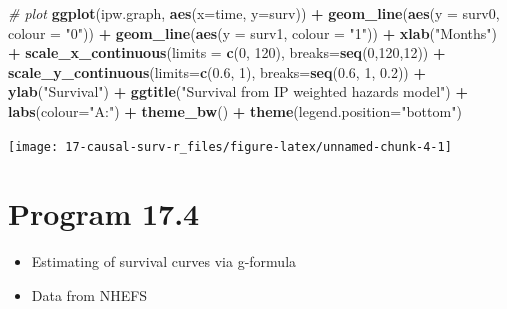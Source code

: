 \documentclass[
  10pt,
]{book}
\newenvironment{Shaded}{\begin{snugshade}}{\end{snugshade}}
\newcommand{\CommentTok}[1]{\textcolor[rgb]{0.56,0.35,0.01}{\textit{#1}}}
\newcommand{\DataTypeTok}[1]{\textcolor[rgb]{0.13,0.29,0.53}{#1}}
\newcommand{\DecValTok}[1]{\textcolor[rgb]{0.00,0.00,0.81}{#1}}
\newcommand{\FloatTok}[1]{\textcolor[rgb]{0.00,0.00,0.81}{#1}}
\newcommand{\KeywordTok}[1]{\textcolor[rgb]{0.13,0.29,0.53}{\textbf{#1}}}
\newcommand{\NormalTok}[1]{#1}
\newcommand{\OperatorTok}[1]{\textcolor[rgb]{0.81,0.36,0.00}{\textbf{#1}}}
\newcommand{\StringTok}[1]{\textcolor[rgb]{0.31,0.60,0.02}{#1}}
\providecommand{\tightlist}{%
  \setlength{\itemsep}{0pt}\setlength{\parskip}{0pt}}
\begin{document}
\begin{Shaded}
\begin{Highlighting}[]
\CommentTok{\# plot}
\KeywordTok{ggplot}\NormalTok{(ipw.graph, }\KeywordTok{aes}\NormalTok{(}\DataTypeTok{x=}\NormalTok{time, }\DataTypeTok{y=}\NormalTok{surv)) }\OperatorTok{+}\StringTok{ }
\StringTok{  }\KeywordTok{geom\_line}\NormalTok{(}\KeywordTok{aes}\NormalTok{(}\DataTypeTok{y =}\NormalTok{ surv0, }\DataTypeTok{colour =} \StringTok{"0"}\NormalTok{)) }\OperatorTok{+}\StringTok{ }
\StringTok{  }\KeywordTok{geom\_line}\NormalTok{(}\KeywordTok{aes}\NormalTok{(}\DataTypeTok{y =}\NormalTok{ surv1, }\DataTypeTok{colour =} \StringTok{"1"}\NormalTok{)) }\OperatorTok{+}\StringTok{ }
\StringTok{  }\KeywordTok{xlab}\NormalTok{(}\StringTok{"Months"}\NormalTok{) }\OperatorTok{+}\StringTok{ }
\StringTok{  }\KeywordTok{scale\_x\_continuous}\NormalTok{(}\DataTypeTok{limits =} \KeywordTok{c}\NormalTok{(}\DecValTok{0}\NormalTok{, }\DecValTok{120}\NormalTok{), }\DataTypeTok{breaks=}\KeywordTok{seq}\NormalTok{(}\DecValTok{0}\NormalTok{,}\DecValTok{120}\NormalTok{,}\DecValTok{12}\NormalTok{)) }\OperatorTok{+}
\StringTok{  }\KeywordTok{scale\_y\_continuous}\NormalTok{(}\DataTypeTok{limits=}\KeywordTok{c}\NormalTok{(}\FloatTok{0.6}\NormalTok{, }\DecValTok{1}\NormalTok{), }\DataTypeTok{breaks=}\KeywordTok{seq}\NormalTok{(}\FloatTok{0.6}\NormalTok{, }\DecValTok{1}\NormalTok{, }\FloatTok{0.2}\NormalTok{)) }\OperatorTok{+}
\StringTok{  }\KeywordTok{ylab}\NormalTok{(}\StringTok{"Survival"}\NormalTok{) }\OperatorTok{+}\StringTok{ }
\StringTok{  }\KeywordTok{ggtitle}\NormalTok{(}\StringTok{"Survival from IP weighted hazards model"}\NormalTok{) }\OperatorTok{+}\StringTok{ }
\StringTok{  }\KeywordTok{labs}\NormalTok{(}\DataTypeTok{colour=}\StringTok{"A:"}\NormalTok{) }\OperatorTok{+}
\StringTok{  }\KeywordTok{theme\_bw}\NormalTok{() }\OperatorTok{+}\StringTok{ }
\StringTok{  }\KeywordTok{theme}\NormalTok{(}\DataTypeTok{legend.position=}\StringTok{"bottom"}\NormalTok{)}
\end{Highlighting}
\end{Shaded}

\begin{center}\texttt{[image: 17-causal-surv-r\_files/figure-latex/unnamed-chunk-4-1]} \end{center}

\hypertarget{program-17.4}{%
\section{Program 17.4}\label{program-17.4}}

\begin{itemize}
\tightlist
\item
  Estimating of survival curves via g-formula
\item
  Data from NHEFS
\end{itemize}
\end{document}
